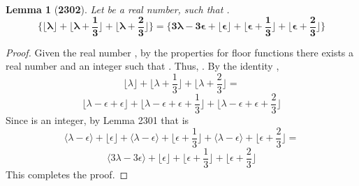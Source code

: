 \documentclass[preview]{standalone}
\newtheorem*{lemma*}{Lemma}
\begin{document}
\begin{lemma*}[\textbf{2302}]
    Let \bm{$\lambda$} be a real number, 
    such that \bm{$\big \lfloor \lambda \big \rfloor + \epsilon = \lambda$}.
    \begin{equation*}
        \bm{
            \Bigg\{
                \bigg \lfloor \lambda \bigg \rfloor 
                    + 
                \bigg \lfloor \lambda + \frac{1}{3} \bigg \rfloor 
                    + 
                \bigg \lfloor \lambda + \frac{2}{3} \bigg \rfloor
            \Bigg\}
                =
            \Bigg\{
                3 \lambda - 3 \epsilon 
                    +
                \bigg \lfloor \epsilon \bigg \rfloor 
                    +
                \bigg \lfloor \epsilon + \frac{1}{3} \bigg \rfloor
                    +
                \bigg \lfloor \epsilon + \frac{2}{3} \bigg \rfloor            
            \Bigg\}
        }
    \end{equation*}
\end{lemma*}

\begin{proof}
    Given the real number \bm{$\lambda$}, 
    by the properties for floor functions
    there exists a real number \bm{$\epsilon$}
    and an integer \bm{$\lambda - \epsilon$} such that 
    \bm{$\lfloor \lambda \rfloor = \lambda - \epsilon$}.
    Thus, \bm{$\lambda = \lambda - \epsilon + \epsilon$}.
    By the identity \bm{$\lambda$},
    \begin{equation*}
        \bigg \lfloor \lambda \bigg \rfloor 
            + 
        \bigg \lfloor \lambda + \frac{1}{3} \bigg \rfloor 
            + 
        \bigg \lfloor \lambda + \frac{2}{3} \bigg \rfloor
            =
    \end{equation*}
    \begin{equation*}
        \bigg \lfloor \lambda - \epsilon + \epsilon \bigg \rfloor 
            + 
        \bigg \lfloor \lambda - \epsilon + \epsilon + \frac{1}{3} \bigg \rfloor 
            + 
        \bigg \lfloor \lambda - \epsilon + \epsilon + \frac{2}{3} \bigg \rfloor
    \end{equation*}
    Since \bm{$\lambda - \epsilon$} is an integer, by Lemma 2301 that is
    \begin{equation*}
        \bigg \langle \lambda - \epsilon \bigg \rangle + \bigg \lfloor \epsilon \bigg \rfloor 
            + 
        \bigg \langle \lambda - \epsilon \bigg \rangle + \bigg \lfloor \epsilon + \frac{1}{3} \bigg \rfloor 
            + 
        \bigg \langle \lambda - \epsilon \bigg \rangle + \bigg \lfloor \epsilon + \frac{2}{3} \bigg \rfloor
            =
    \end{equation*}
    \begin{equation*}
        \bigg \langle 3 \lambda - 3 \epsilon \bigg \rangle
            + 
        \bigg \lfloor \epsilon \bigg \rfloor 
            + 
        \bigg \lfloor \epsilon + \frac{1}{3} \bigg \rfloor 
            + 
        \bigg \lfloor \epsilon + \frac{2}{3} \bigg \rfloor
    \end{equation*}
    This completes the proof.
\color{lightgray} \end{proof}
\end{document}
